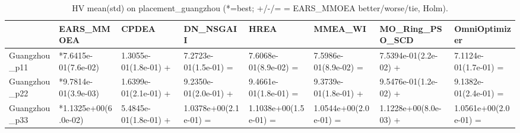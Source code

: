 \begin{table}[t]
\centering
\caption{HV mean(std) on placement_guangzhou (*=best; +/-/= = EARS_MMOEA better/worse/tie, Holm).}
\label{tab:placement_guangzhou_HV}
\begin{tabular}{llllllll}
\toprule
 & EARS\_MMOEA & CPDEA & DN\_NSGAII & HREA & MMEA\_WI & MO\_Ring\_PSO\_SCD & OmniOptimizer \\
\midrule
Guangzhou\_p11 & *7.6415e-01(7.6e-02) & 1.3055e-01(1.8e-01) + & 7.2723e-01(1.5e-01) = & 7.6068e-01(8.9e-02) = & 7.5986e-01(8.9e-02) = & 7.5394e-01(2.2e-02) + & 7.1124e-01(1.7e-01) = \\
Guangzhou\_p22 & *9.7814e-01(3.9e-03) & 1.6399e-01(2.1e-01) + & 9.2350e-01(2.0e-01) + & 9.4661e-01(1.8e-01) = & 9.3739e-01(1.8e-01) + & 9.5476e-01(1.2e-02) + & 9.1382e-01(2.4e-01) = \\
Guangzhou\_p33 & *1.1325e+00(6.0e-02) & 5.4845e-01(1.8e-01) + & 1.0378e+00(2.1e-01) = & 1.1038e+00(1.5e-01) = & 1.0544e+00(2.0e-01) = & 1.1228e+00(8.0e-03) + & 1.0561e+00(2.0e-01) = \\
\bottomrule
\end{tabular}
\end{table}
